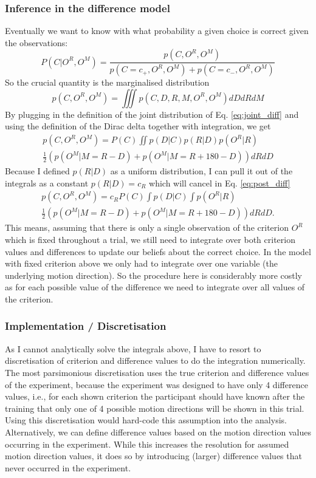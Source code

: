 \documentclass[10pt,a4paper]{article}
\begin{document}
\subsubsection{Inference in the difference model}
Eventually we want to know with what probability a given choice is correct given the observations:
\begin{equation}\label{eq:post_diff}
P(C | O^R, O^M) = \frac{p(C, O^R, O^M)}{p(C=c_+, O^R, O^M) + p(C=c_-, O^R, O^M)}
\end{equation}
So the crucial quantity is the marginalised distribution
\begin{equation}
p(C, O^R, O^M) = \iiint p(C, D, R, M, O^R, O^M) dD dR dM
\end{equation}
By plugging in the definition of the joint distribution of Eq. \eqref{eq:joint_diff} and using the definition of the Dirac delta together with integration, we get
\begin{multline}
p(C, O^R, O^M) = P(C) \iint p(D | C) p(R | D) p(O^R | R)\\ 
\frac{1}{2}\left(p(O^M | M = R - D) + p(O^M | M = R + 180 - D)\right) dR dD
\end{multline}
Because I defined $p(R | D)$ as a uniform distribution, I can pull it out of the integrals as a constant $p(R | D) = c_R$ which will cancel in Eq. \eqref{eq:post_diff}
\begin{multline}
p(C, O^R, O^M) = c_R P(C) \int p(D | C) \int p(O^R | R)\\
\frac{1}{2}\left(p(O^M | M = R - D) + p(O^M | M = R + 180 - D)\right) dR dD.
\end{multline}
This means, assuming that there is only a single observation of the criterion $O^R$ which is fixed throughout a trial, we still need to integrate over both criterion values and differences to update our beliefs about the correct choice. In the model with fixed criterion above we only had to integrate over one variable (the underlying motion direction). So the procedure here is considerably more costly as for each possible value of the difference we need to integrate over all values of the criterion.

\subsubsection{Implementation / Discretisation}
As I cannot analytically solve the integrals above, I have to resort to discretisation of criterion and difference values to do the integration numerically. The most parsimonious discretisation uses the true criterion and difference values of the experiment, because the experiment was designed to have only 4 difference values, i.e., for each shown criterion the participant should have known after the training that only one of 4 possible motion directions will be shown in this trial. Using this discretisation would hard-code this assumption into the analysis. Alternatively, we can define difference values based on the motion direction values occurring in the experiment. While this increases the resolution for assumed motion direction values, it does so by introducing (larger) difference values that never occurred in the experiment.
\end{document}
